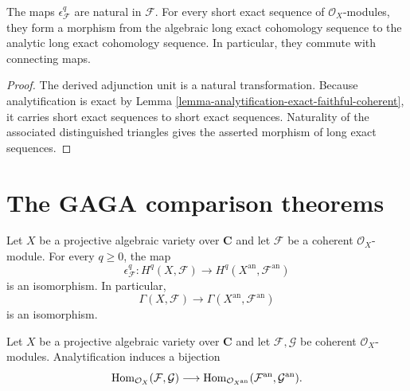 \begin{lemma}
\label{lemma-analytification-cohomology-map-functorial}
The maps $\epsilon^q_{\mathcal F}$ are natural in $\mathcal F$. For every
short exact sequence of $\mathcal O_X$-modules, they form a morphism from
the algebraic long exact cohomology sequence to the analytic long exact
cohomology sequence. In particular, they commute with connecting maps.
\end{lemma}

\begin{proof}
The derived adjunction unit is a natural transformation. Because
analytification is exact by Lemma
\ref{lemma-analytification-exact-faithful-coherent}, it carries short exact
sequences to short exact sequences. Naturality of the associated
distinguished triangles gives the asserted morphism of long exact
sequences.
\end{proof}


\section{The GAGA comparison theorems}
\label{section-gaga-statements}

\begin{theorem}
\label{theorem-gaga-cohomology}
\begin{reference}
\cite[\S 3, no. 12, Theorem 1]{GAGA}
\end{reference}
Let $X$ be a projective algebraic variety over $\mathbf C$ and let
$\mathcal F$ be a coherent $\mathcal O_X$-module. For every $q\geq0$, the
map
$$
\epsilon^q_{\mathcal F}:H^q(X,\mathcal F)
\longrightarrow H^q(X^{\mathrm{an}},\mathcal F^{\mathrm{an}})
$$
is an isomorphism. In particular,
$$
\Gamma(X,\mathcal F)\longrightarrow
\Gamma(X^{\mathrm{an}},\mathcal F^{\mathrm{an}})
$$
is an isomorphism.
\end{theorem}

\begin{theorem}
\label{theorem-gaga-fully-faithful}
\begin{reference}
\cite[\S 3, no. 12, Theorem 2]{GAGA}
\end{reference}
Let $X$ be a projective algebraic variety over $\mathbf C$ and let
$\mathcal F,\mathcal G$ be coherent $\mathcal O_X$-modules. Analytification
induces a bijection
$$
\mathop{\rm Hom}\nolimits_{\mathcal O_X}(\mathcal F,\mathcal G)
\longrightarrow
\mathop{\rm Hom}\nolimits_{\mathcal O_{X^{\mathrm{an}}}}
(\mathcal F^{\mathrm{an}},\mathcal G^{\mathrm{an}}).
$$
\end{theorem}

